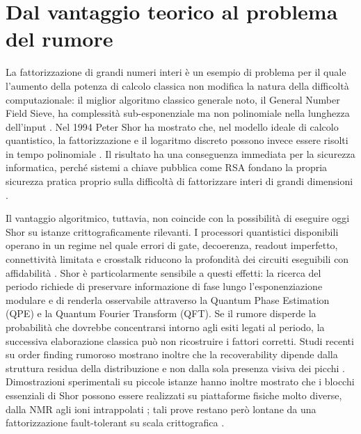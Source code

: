 
\section{Dal vantaggio teorico al problema del rumore}\label{sec:finale_1_1}

La fattorizzazione di grandi numeri interi è un esempio di problema per il quale l'aumento della potenza di calcolo classica non modifica la natura della difficoltà computazionale: il miglior algoritmo classico generale noto, il General Number Field Sieve, ha complessità sub-esponenziale ma non polinomiale nella lunghezza dell'input \cite{buhler1993gnfs,rsa250_2020}. Nel 1994 Peter Shor ha mostrato che, nel modello ideale di calcolo quantistico, la fattorizzazione e il logaritmo discreto possono invece essere risolti in tempo polinomiale \cite{shor1994}. Il risultato ha una conseguenza immediata per la sicurezza informatica, perché sistemi a chiave pubblica come RSA fondano la propria sicurezza pratica proprio sulla difficoltà di fattorizzare interi di grandi dimensioni \cite{rsa1978}.

Il vantaggio algoritmico, tuttavia, non coincide con la possibilità di eseguire oggi Shor su istanze crittograficamente rilevanti. I processori quantistici disponibili operano in un regime nel quale errori di gate, decoerenza, readout imperfetto, connettività limitata e crosstalk riducono la profondità dei circuiti eseguibili con affidabilità \cite{preskill2018}. Shor è particolarmente sensibile a questi effetti: la ricerca del periodo richiede di preservare informazione di fase lungo l'esponenziazione modulare e di renderla osservabile attraverso la Quantum Phase Estimation (QPE) e la Quantum Fourier Transform (QFT). Se il rumore disperde la probabilità che dovrebbe concentrarsi intorno agli esiti legati al periodo, la successiva elaborazione classica può non ricostruire i fattori corretti. Studi recenti su order finding rumoroso mostrano inoltre che la recoverability dipende dalla struttura residua della distribuzione e non dalla sola presenza visiva dei picchi \cite{skosana2021,yang2026,smolin2013}. Dimostrazioni sperimentali su piccole istanze hanno inoltre mostrato che i blocchi essenziali di Shor possono essere realizzati su piattaforme fisiche molto diverse, dalla NMR agli ioni intrappolati \cite{vandersypen2001,monz2016}; tali prove restano però lontane da una fattorizzazione fault-tolerant su scala crittografica \cite{smolin2013,gidney2021}.

